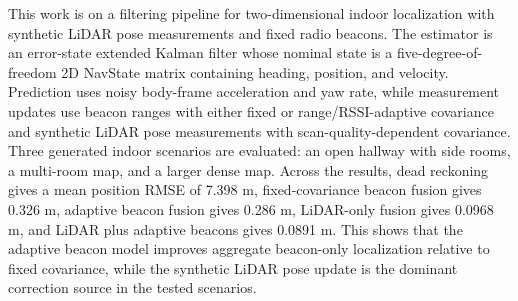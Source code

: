 This work is on a filtering pipeline for two-dimensional indoor localization with synthetic LiDAR pose measurements and fixed radio beacons. The estimator is an error-state extended Kalman filter whose nominal state is a five-degree-of-freedom 2D NavState matrix containing heading, position, and velocity. Prediction uses noisy body-frame acceleration and yaw rate, while measurement updates use beacon ranges with either fixed or range/RSSI-adaptive covariance and synthetic LiDAR pose measurements with scan-quality-dependent covariance. Three generated indoor scenarios are evaluated: an open hallway with side rooms, a multi-room map, and a larger dense map. Across the results, dead reckoning gives a mean position RMSE of 7.398 m, fixed-covariance beacon fusion gives 0.326 m, adaptive beacon fusion gives 0.286 m, LiDAR-only fusion gives 0.0968 m, and LiDAR plus adaptive beacons gives 0.0891 m. This shows that the adaptive beacon model improves aggregate beacon-only localization relative to fixed covariance, while the synthetic LiDAR pose update is the dominant correction source in the tested scenarios.
